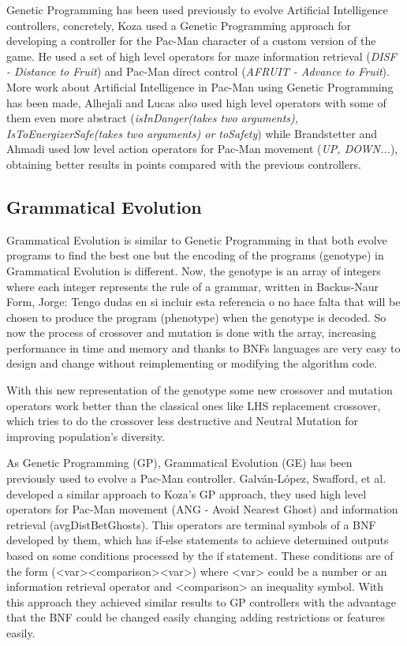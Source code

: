 \documentclass{llncs}
\begin{document}
Genetic Programming has been used previously to evolve Artificial Intelligence controllers, concretely, Koza\cite{koza1992genetic} used a Genetic Programming approach for developing a controller for the Pac-Man character of a custom version of the game. He used a set of high level operators for maze information retrieval (\textit{DISF - Distance to Fruit}) and Pac-Man direct control (\textit{AFRUIT - Advance to Fruit}).
More work about Artificial Intelligence in Pac-Man using Genetic Programming has been made, Alhejali and Lucas\cite{alhejali_lucas_2010}
also used high level operators with some of them even more abstract (\textit{isInDanger(takes two arguments), IsToEnergizerSafe(takes two arguments) or toSafety}) while Brandstetter and Ahmadi\cite{brandstetter_ahmadi_2012}
used low level action operators for Pac-Man movement (\textit{UP, DOWN...}), obtaining better results in points compared with the previous controllers.
\subsection{Grammatical Evolution}
Grammatical Evolution is similar to Genetic Programming in that both evolve programs to find the best one but the encoding of the programs (genotype) in Grammatical Evolution is different. Now, the genotype is an array of integers where each integer represents the rule of a grammar, written in Backus-Naur Form, {\color{red} Jorge: Tengo dudas en si incluir esta referencia o no hace falta}\cite{garshol}
that will be chosen to produce the program (phenotype) when the genotype is decoded. So now the process of crossover and mutation is done with the array, increasing performance in time and memory and thanks to BNFs languages are very easy to design and change without reimplementing or modifying the algorithm code.\cite{o'neill_ryan_2012}

With this new representation of the genotype some new crossover and mutation operators work better than the classical ones like LHS replacement crossover, which tries to do the crossover less destructive\cite{harper_blair_2005}
and Neutral Mutation for improving population's diversity.\cite{oesch_maringer_2014}

As Genetic Programming (GP), Grammatical Evolution (GE) has been previously used to evolve a Pac-Man controller. Galván-López, Swafford, et al.\cite{galvan2010evolving}
developed a similar approach to Koza's GP approach, they used high level operators for Pac-Man movement (ANG - Avoid Nearest Ghost) and information retrieval (avgDistBetGhosts). This operators are terminal symbols of a BNF developed by them, which has if-else statements to achieve determined outputs based on some conditions processed by the if statement. These conditions are of the form (<var><comparison><var>) where <var> could be a number or an information retrieval operator and <comparison> an inequality symbol. With this approach they achieved similar results to GP controllers with the advantage that the BNF could be changed easily changing adding restrictions or features easily.
\end{document}
